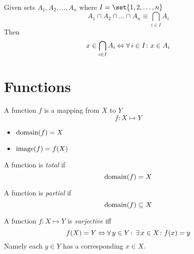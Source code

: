 \begin{definition}\ \\
    Given sets $A_1, A_2, \dots, A_n$ where $I = \set{1, 2, \dots, n}$
    \begin{equation}
        A_1 \cap A_2 \cap \dots \cap A_n \equiv \bigcap_{i \in I} A_i
    \end{equation}
    Then
    \begin{equation}
        x \in \bigcap_{i \in I} A_i \Leftrightarrow \operatorname{\forall} i \in I \colon x \in A_i
    \end{equation}
\end{definition}

\section{Functions}
\begin{definition}[Function]
    A function $f$ is a mapping from $X$ to $Y$
    \begin{equation}
        f \colon X \mapsto Y
    \end{equation}
    \begin{itemize}
        \item $\operatorname{domain}({f}) = X$
        \item $\operatorname{image}({f}) = f(X)$
    \end{itemize}
\end{definition}

\begin{definition}
    A function is \textit{total} if
    \begin{equation}
        \operatorname{domain}({f}) = X
    \end{equation}
\end{definition}

\begin{definition}
    A function is \textit{partial} if
    \begin{equation}
        \operatorname{domain}({f}) \subseteq X
    \end{equation}
\end{definition}

\begin{definition}[Surjection]
    A function $f \colon X \mapsto Y$ is \textit{surjective} iff
    \begin{equation}
        f(X) = Y \Leftrightarrow \operatorname{\forall} y \in Y \colon \operatorname{\exists} x \in X \colon f(x) = y
    \end{equation}
    Namely each $y \in Y$ has a corresponding $x \in X$.
\end{definition}

